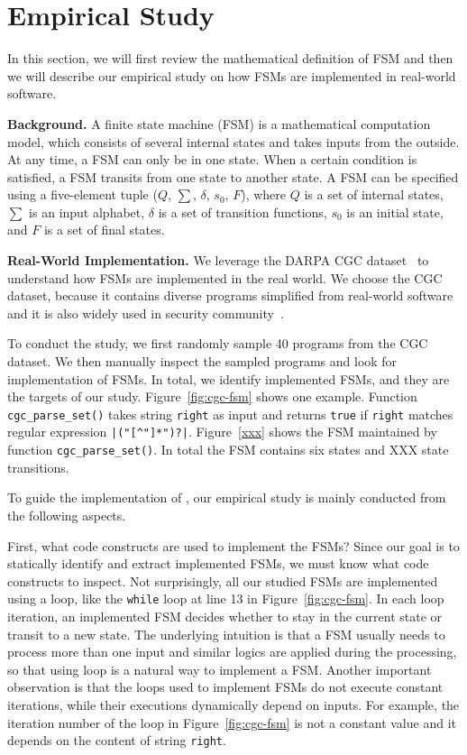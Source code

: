 \section{Empirical Study}
\label{sec:study}
In this section, we will first review the mathematical definition of FSM and then 
we will describe our empirical study on how FSMs are implemented 
in real-world software. 

\noindent\textbf{Background.}
A finite state machine (FSM) is a mathematical computation model, 
which consists of several internal states and takes inputs from the outside.
At any time, a FSM can only be in one state. 
When a certain condition is satisfied, 
a FSM transits from one state to another state. 
A FSM can be specified using a five-element tuple ($Q$, $\sum$, $\delta$, $s_0$, $F$),
where $Q$ is a set of internal states, $\sum$ is an input alphabet, 
$\delta$ is a set of transition functions,
$s_0$ is an initial state, and $F$ is a set of final states. 

\noindent\textbf{Real-World Implementation.}
We leverage the DARPA CGC dataset~\cite{CGC} to 
understand how FSMs are implemented in the real world. 
We choose the CGC dataset, because it 
contains diverse programs simplified 
from real-world software and it is also widely used in security 
community~\cite{QSYM, Driller, VUzzer}. 

To conduct the study, we first randomly sample 
40 programs from the CGC dataset.
We then manually inspect the sampled programs and look for implementation of FSMs.
In total, we identify {\color{red}{XXX}} implemented FSMs, 
and they are the targets of our study.
Figure~\ref{fig:cgc-fsm} shows one example.
Function \texttt{cgc\_parse\_set()} takes string \texttt{right} 
as input and returns \texttt{true} if \texttt{right} matches 
regular expression \verb/|("[^"]*")?|/. 
Figure~\ref{xxx} shows the FSM maintained by function \texttt{cgc\_parse\_set()}. 
In total the FSM contains six states and {\color{red} XXX} 
state transitions. 



To guide the implementation of \Tool{}, our empirical study 
is mainly conducted from the following aspects. 

First, what code constructs are used to implement the FSMs?
Since our goal is to statically identify and extract implemented FSMs, 
we must know what code constructs to inspect. 
Not surprisingly, all our studied FSMs are implemented using a loop, 
like the \texttt{while} loop at line 13 in Figure~\ref{fig:cgc-fsm}.  
In each loop iteration, an implemented FSM 
decides whether to stay in the current state or transit to a new state. 
The underlying intuition is that a FSM usually needs to process 
more than one input and similar logics are applied during the processing, 
so that using loop is a natural way to implement a FSM. 
Another important observation is that 
the loops used to implement FSMs do not execute constant iterations,
while their executions dynamically depend on inputs. 
For example, the iteration number of the loop in Figure~\ref{fig:cgc-fsm}
is not a constant value and it depends on the content of string \texttt{right}.

